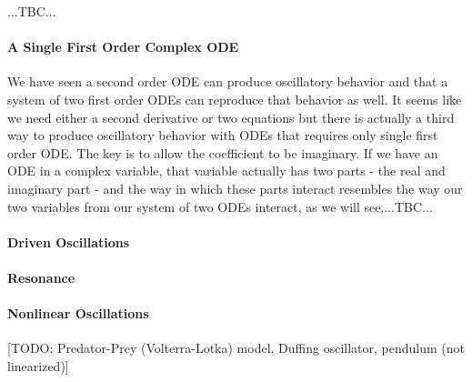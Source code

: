 ...TBC...


\paragraph{A Single First Order Complex ODE}
We have seen a second order ODE can produce oscillatory behavior and that a system of two first order ODEs can reproduce that behavior as well. It seems like we need either a second derivative or two equations but there is actually a third way to produce oscillatory behavior with ODEs that requires only single first order ODE. The key is to allow the coefficient to be imaginary. If we have an ODE in a complex variable, that variable actually has two parts - the real and imaginary part - and the way in which these parts interact resembles the way our two variables from our system of two ODEs interact, as we will see....TBC...



\paragraph{Driven Oscillations}

\paragraph{Resonance}

\paragraph{Nonlinear Oscillations}
[TODO: Predator-Prey (Volterra-Lotka) model, Duffing oscillator, pendulum (not linearized)]


